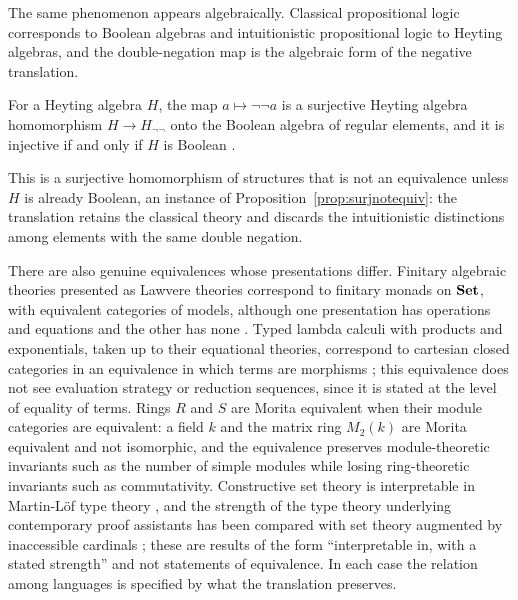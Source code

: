 The same phenomenon appears algebraically. Classical propositional logic corresponds to Boolean algebras and intuitionistic propositional logic to Heyting algebras, and the double-negation map is the algebraic form of the negative translation.

\begin{proposition}\label{prop:glivenko}
For a Heyting algebra $H$, the map $a\mapsto\neg\neg a$ is a surjective Heyting algebra homomorphism $H\to H_{\neg\neg}$ onto the Boolean algebra of regular elements, and it is injective if and only if $H$ is Boolean \cite{glivenko}.
\end{proposition}

This is a surjective homomorphism of structures that is not an equivalence unless $H$ is already Boolean, an instance of Proposition~\ref{prop:surjnotequiv}: the translation retains the classical theory and discards the intuitionistic distinctions among elements with the same double negation.

There are also genuine equivalences whose presentations differ. Finitary algebraic theories presented as Lawvere theories correspond to finitary monads on $\mathbf{Set}$, with equivalent categories of models, although one presentation has operations and equations and the other has none \cite{lawvere}. Typed lambda calculi with products and exponentials, taken up to their equational theories, correspond to cartesian closed categories in an equivalence in which terms are morphisms \cite{lambekscott}; this equivalence does not see evaluation strategy or reduction sequences, since it is stated at the level of equality of terms. Rings $R$ and $S$ are Morita equivalent when their module categories are equivalent: a field $k$ and the matrix ring $M_2(k)$ are Morita equivalent and not isomorphic, and the equivalence preserves module-theoretic invariants such as the number of simple modules while losing ring-theoretic invariants such as commutativity. Constructive set theory is interpretable in Martin-L\"of type theory \cite{aczel}, and the strength of the type theory underlying contemporary proof assistants has been compared with set theory augmented by inaccessible cardinals \cite{carneiro}; these are results of the form ``interpretable in, with a stated strength'' and not statements of equivalence. In each case the relation among languages is specified by what the translation preserves.


